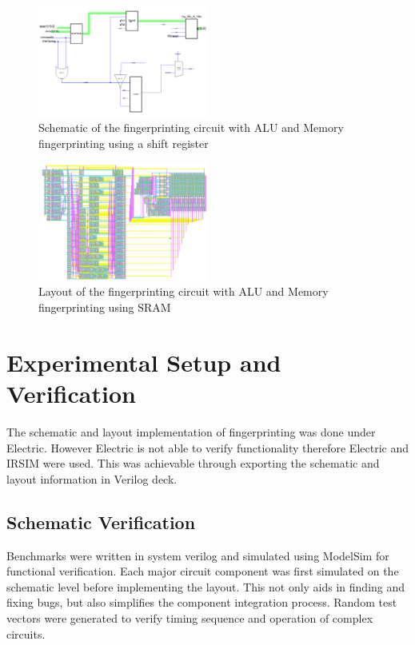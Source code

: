\documentclass[10pt,journal,compsoc]{IEEEtran}
\begin{document}
\begin{figure}[h!]
  \centering

      \includegraphics[width=0.5\textwidth]{schematic}
  \caption{Schematic of the fingerprinting circuit with ALU and Memory fingerprinting using a shift register}
\end{figure}
\begin{figure}[h!]
  \centering

      \includegraphics[width=0.5\textwidth]{layout1}
  \caption{Layout of the fingerprinting circuit with ALU and Memory fingerprinting using SRAM}
\end{figure}


\section{Experimental Setup and Verification}
The schematic and layout implementation of fingerprinting was done under Electric. However Electric is not able to verify functionality therefore Electric and IRSIM were used. This was achievable through exporting the schematic and layout information in Verilog deck.

\subsection{Schematic Verification}
Benchmarks were written in system verilog and simulated using ModelSim for functional verification. Each major circuit component was first simulated on the schematic level before implementing the layout. This not only aids in finding and fixing bugs, but also simplifies the component integration process. Random test vectors were generated to verify timing sequence and operation of complex circuits.
\end{document}
